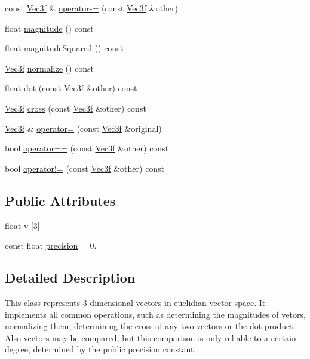 \begin{DoxyCompactItemize}
\item 
const \hyperlink{class_vec3f}{Vec3f} \& \hyperlink{class_vec3f_a22376a2e23c90ba8119b7c475d2a0583}{operator-\/=} (const \hyperlink{class_vec3f}{Vec3f} \&other)
\item 
float \hyperlink{class_vec3f_af736ea593ed963c40c8776d4014d4e79}{magnitude} () const 
\item 
float \hyperlink{class_vec3f_aa4cc7ae415806c6b831218fde0624598}{magnitude\+Squared} () const 
\item 
\hyperlink{class_vec3f}{Vec3f} \hyperlink{class_vec3f_a7532bd9c039aee160a7347e63ef07217}{normalize} () const 
\item 
float \hyperlink{class_vec3f_a4be996396b524f4f55c50a2cb2a80809}{dot} (const \hyperlink{class_vec3f}{Vec3f} \&other) const 
\item 
\hyperlink{class_vec3f}{Vec3f} \hyperlink{class_vec3f_adf78d471e54893a6ef8031f1dfb83dff}{cross} (const \hyperlink{class_vec3f}{Vec3f} \&other) const 
\item 
\hyperlink{class_vec3f}{Vec3f} \& \hyperlink{class_vec3f_acdfbaa6eb50d32130ec43572cecd6ca9}{operator=} (const \hyperlink{class_vec3f}{Vec3f} \&original)
\item 
bool \hyperlink{class_vec3f_a8b2a161264d6ce9882e216636454fe6e}{operator==} (const \hyperlink{class_vec3f}{Vec3f} \&other) const 
\item 
bool \hyperlink{class_vec3f_a3953560eda8c5513247e59e00dc96fd8}{operator!=} (const \hyperlink{class_vec3f}{Vec3f} \&other) const 
\end{DoxyCompactItemize}
\subsection*{Public Attributes}
\begin{DoxyCompactItemize}
\item 
float \hyperlink{class_vec3f_afa0e0436144050846e8b8ab3e769f08c}{v} \mbox{[}3\mbox{]}
\item 
const float \hyperlink{class_vec3f_a1b5b4e544cc80cab1649a3b6f5cb4cd1}{precision} = 0.
\end{DoxyCompactItemize}


\subsection{Detailed Description}
This class represents 3-\/dimensional vectors in euclidian vector space. It implements all common operations, such as determining the magnitudes of vetors, normalizing them, determining the cross of any two vectors or the dot product. Also vectors may be compared, but this comparison is only reliable to a certain degree, determined by the public precision constant. 

